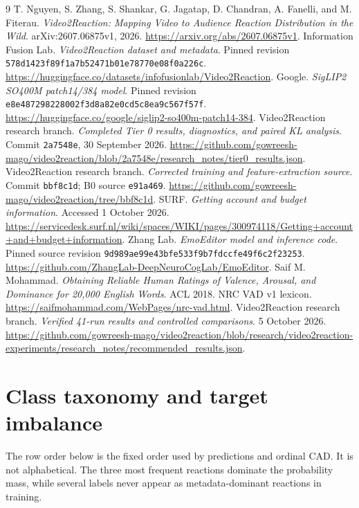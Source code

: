\documentclass[11pt,a4paper]{article}
\newcommand{\tbl}[1]{\FloatBarrier}
\newcommand{\code}[1]{\texttt{#1}}
\begin{document}
\begin{thebibliography}{9}
 T. Nguyen, S. Zhang, S. Shankar, G. Jagatap, D. Chandran, A. Fanelli, and M. Fiterau.
\emph{Video2Reaction: Mapping Video to Audience Reaction Distribution in the Wild}. arXiv:2607.06875v1, 2026.
\url{https://arxiv.org/abs/2607.06875v1}.
 Information Fusion Lab. \emph{Video2Reaction dataset and metadata}. Pinned revision \nolinkurl{578d1423f89f1a7b52471b01e78770e08f0a226c}.
\url{https://huggingface.co/datasets/infofusionlab/Video2Reaction}.
 Google. \emph{SigLIP2 SO400M patch14/384 model}. Pinned revision \nolinkurl{e8e487298228002f3d8a82e0cd5c8ea9c567f57f}.
\url{https://huggingface.co/google/siglip2-so400m-patch14-384}.
 Video2Reaction research branch. \emph{Completed Tier 0 results, diagnostics, and paired KL analysis}. Commit \code{2a7548e}, 30 September 2026.
\url{https://github.com/gowreesh-mago/video2reaction/blob/2a7548e/research_notes/tier0_results.json}.
 Video2Reaction research branch. \emph{Corrected training and feature-extraction source}. Commit \code{bbf8c1d}; B0 source \code{e91a469}.
\url{https://github.com/gowreesh-mago/video2reaction/tree/bbf8c1d}.
 SURF. \emph{Getting account and budget information}. Accessed 1 October 2026.
\url{https://servicedesk.surf.nl/wiki/spaces/WIKI/pages/300974118/Getting+account+and+budget+information}.
 Zhang Lab. \emph{EmoEditor model and inference code}. Pinned source revision \nolinkurl{9d989ae99e43bfe533f9b7fdccfe49f6c2f23253}.
\url{https://github.com/ZhangLab-DeepNeuroCogLab/EmoEditor}.
 Saif M. Mohammad. \emph{Obtaining Reliable Human Ratings of Valence, Arousal, and Dominance for 20,000 English Words}. ACL 2018. NRC VAD v1 lexicon.
\url{https://saifmohammad.com/WebPages/nrc-vad.html}.
 Video2Reaction research branch. \emph{Verified 41-run results and controlled comparisons}. 5 October 2026.
\url{https://github.com/gowreesh-mago/video2reaction/blob/research/video2reaction-experiments/research_notes/recommended_results.json}.
\end{thebibliography}

\appendix
\clearpage
\section{Class taxonomy and target imbalance}\label{app:taxonomy}
The row order below is the fixed order used by predictions and ordinal CAD. It is not alphabetical. The three most frequent reactions dominate the probability mass, while several labels never appear as metadata-dominant reactions in training.
\tbl{taxonomy}
\end{document}
